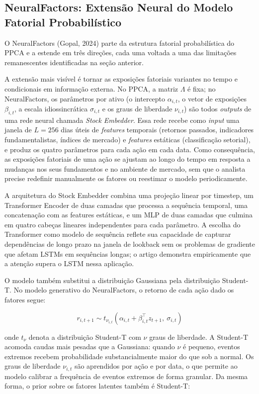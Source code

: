 \subsection{NeuralFactors: Extensão Neural do Modelo Fatorial Probabilístico}

O NeuralFactors (Gopal, 2024) parte da estrutura fatorial probabilística do PPCA e a estende em três direções, cada uma voltada a uma das limitações remanescentes identificadas na seção anterior.

A extensão mais visível é tornar as exposições fatoriais variantes no tempo e condicionais em informação externa. No PPCA, a matriz $\Lambda$ é fixa; no NeuralFactors, os parâmetros por ativo (o intercepto $\alpha_{i,t}$, o vetor de exposições $\beta_{i,t}$, a escala idiossincrática $\sigma_{i,t}$ e os graus de liberdade $\nu_{i,t}$) são todos \textit{outputs} de uma rede neural chamada \textit{Stock Embedder}. Essa rede recebe como \textit{input} uma janela de $L=256$ dias úteis de \textit{features} temporais (retornos passados, indicadores fundamentalistas, índices de mercado) e \textit{features} estáticas (classificação setorial), e produz os quatro parâmetros para cada ação em cada data. Como consequência, as exposições fatoriais de uma ação se ajustam ao longo do tempo em resposta a mudanças nos seus fundamentos e no ambiente de mercado, sem que o analista precise redefinir manualmente os fatores ou reestimar o modelo periodicamente.

A arquitetura do Stock Embedder combina uma projeção linear por timestep, um Transformer Encoder de duas camadas que processa a sequência temporal, uma concatenação com as features estáticas, e um MLP de duas camadas que culmina em quatro cabeças lineares independentes para cada parâmetro. A escolha do Transformer como modelo de sequência reflete sua capacidade de capturar dependências de longo prazo na janela de lookback sem os problemas de gradiente que afetam LSTMs em sequências longas; o artigo demonstra empiricamente que a atenção supera o LSTM nessa aplicação.

O modelo também substitui a distribuição Gaussiana pela distribuição Student-T. No modelo generativo do NeuralFactors, o retorno de cada ação dado os fatores segue:

$$r_{i,t+1} \sim t_{\nu_{i,t}}(\alpha_{i,t} + \beta_{i,t}^\top z_{t+1},\ \sigma_{i,t})$$

onde $t_\nu$ denota a distribuição Student-T com $\nu$ graus de liberdade. A Student-T acomoda caudas mais pesadas que a Gaussiana: quando $\nu$ é pequeno, eventos extremos recebem probabilidade substancialmente maior do que sob a normal. Os graus de liberdade $\nu_{i,t}$ são aprendidos por ação e por data, o que permite ao modelo calibrar a frequência de eventos extremos de forma granular. Da mesma forma, o prior sobre os fatores latentes também é Student-T:

